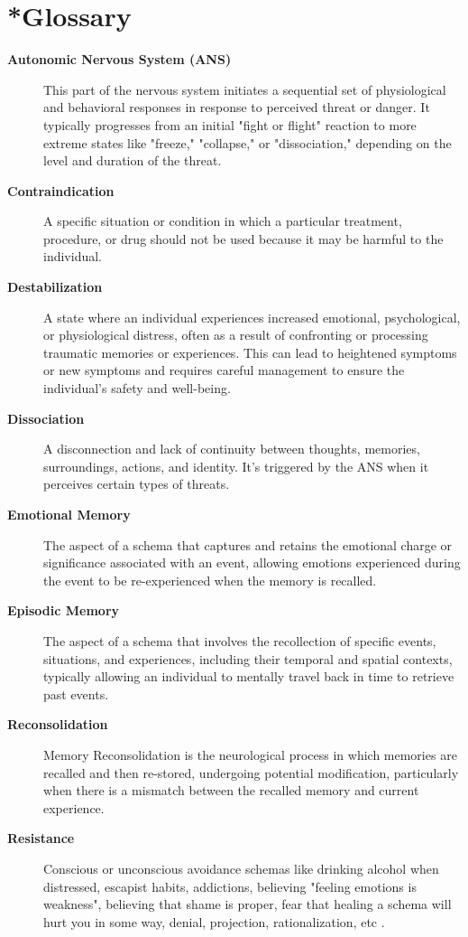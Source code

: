 \documentclass[12pt,letterpaper]{article}
\begin{document}
\section{*Glossary}
\label{sec:glossary}
\begin{description}
    \item[\textbf{Autonomic Nervous System (ANS)}] This part of the nervous system initiates a sequential set of physiological and behavioral responses in response to perceived threat or danger. It typically progresses from an initial "fight or flight" reaction to more extreme states like "freeze," "collapse," or "dissociation," depending on the level and duration of the threat.
    \item[\textbf{Contraindication}] A specific situation or condition in which a particular treatment, procedure, or drug should not be used because it may be harmful to the individual.
    \item[\textbf{Destabilization}] A state where an individual experiences increased emotional, psychological, or physiological distress, often as a result of confronting or processing traumatic memories or experiences. This can lead to heightened symptoms or new symptoms and requires careful management to ensure the individual's safety and well-being.
    \item[\textbf{Dissociation}] A disconnection and lack of continuity between thoughts, memories, surroundings, actions, and identity. It's triggered by the ANS when it perceives certain types of threats.
    \item[\textbf{Emotional Memory}] The aspect of a schema that captures and retains the emotional charge or significance associated with an event, allowing emotions experienced during the event to be re-experienced when the memory is recalled.
    \item[\textbf{Episodic Memory}] The aspect of a schema that involves the recollection of specific events, situations, and experiences, including their temporal and spatial contexts, typically allowing an individual to mentally travel back in time to retrieve past events.
    \item[\textbf{Reconsolidation}] Memory Reconsolidation is the neurological process in which memories are recalled and then re-stored, undergoing potential modification, particularly when there is a mismatch between the recalled memory and current experience.
    \item[\textbf{Resistance}] Conscious or unconscious avoidance schemas like drinking alcohol when distressed, escapist habits, addictions, believing "feeling emotions is weakness", believing that shame is proper, fear that healing a schema will hurt you in some way, denial, projection, rationalization, etc \cite{eckerUnlocking}.

\end{description}
\end{document}
